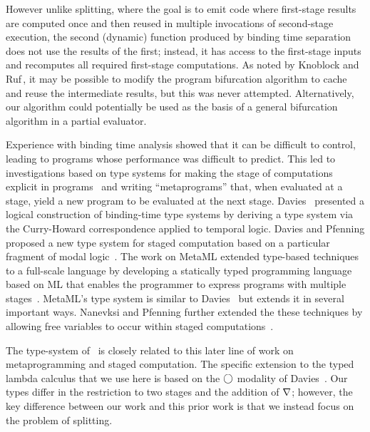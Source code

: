 However unlike splitting, where the goal is to emit code where first-stage results
are computed once and then reused in multiple invocations of second-stage execution, 
the second (dynamic) function produced by binding time separation
does not use the results of the first; instead,
it has access to the first-stage inputs and recomputes all required
first-stage computations. As noted by Knoblock and
Ruf\,\cite{knoblock96}, it may be possible to modify the program
bifurcation algorithm to cache and reuse the intermediate results, but
this was never attempted.
Alternatively, our algorithm could potentially be used as the basis of a general
bifurcation algorithm in a partial evaluator.

Experience with binding time analysis showed that it can be difficult
to control, leading to programs whose performance was difficult to
predict. This led to investigations based on type systems for making
the stage of computations explicit in
programs~\cite{GJ91-lambda,NN92-twolevel} and writing ``metaprograms''
that, when evaluated at a stage, yield a new program to be evaluated
at the next stage.  Davies~\cite{davies96} presented a logical
construction of binding-time type systems by deriving a type system
via the Curry-Howard correspondence applied to temporal logic.  Davies
and Pfenning proposed a new type system for staged computation based
on a particular fragment of modal logic~\cite{DP01-modal}. The work on
MetaML extended type-based techniques to a full-scale language by
developing a statically typed programming language based on ML that
enables the programmer to express programs with multiple
stages~\cite{Taha97,taha-thesis-99}.  MetaML's type system is similar
to Davies~\cite{davies96} but extends it in several important ways.
Nanevksi and Pfenning further extended the these techniques by
allowing free variables to occur within staged
computations~\cite{NP05-nn}.

The type-system of \lang\ is closely related to this later line of
work on metaprogramming and staged computation.  The specific
extension to the typed lambda calculus that we use here is based on
the $\bigcirc$ modality of Davies~\cite{DP01-modal}.  Our types differ 
in the restriction to two stages and the addition of $\nabla$; 
however, the key difference between our work and this prior
work is that we instead focus on the problem of splitting.

